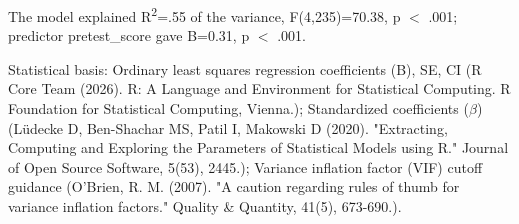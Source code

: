 \documentclass{article}
\begin{document}
The model explained R\textsuperscript{2}=.55 of the variance, F(4,235)=70.38, p $<$ .001; predictor pretest\_score gave B=0.31, p $<$ .001.

Statistical basis: Ordinary least squares regression coefficients (B), SE, CI (R Core Team (2026). R: A Language and Environment for Statistical Computing. R Foundation for Statistical Computing, Vienna.); Standardized coefficients ($\beta$) (Lüdecke D, Ben-Shachar MS, Patil I, Makowski D (2020). "Extracting, Computing and Exploring the Parameters of Statistical Models using R." Journal of Open Source Software, 5(53), 2445.); Variance inflation factor (VIF) cutoff guidance (O’Brien, R. M. (2007). "A caution regarding rules of thumb for variance inflation factors." Quality \& Quantity, 41(5), 673-690.).
\end{document}
